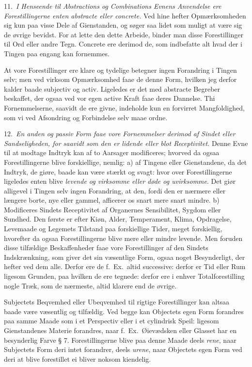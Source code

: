 \documentclass[12pt,a4paper]{article}
\newcommand{\opage}[1]{\marginnote{\footnotesize\textit{[#1]}}}
\begin{document}
11.~\emph{I Henseende til Abstractions og Combinations Evnens Anvendelse ere
Forestillingerne enten abstracte eller concrete.} Ved hine hefter Opmærksomheden sig
kun paa visse Dele af Gienstanden, og søger saa lidet som muligt at være sig de
øvrige bevidst. For at lette den dette Arbeide, binder man disse Forestillinger til
Ord eller andre Tegn. Concrete ere derimod de, som indbefatte alt hvad der i Tingen
paa engang kan fornemmes.

At vore Forestillinger ere klare og tydelige betegner ingen Forandring i Tingen selv;
men ved virksom Opmærksomhed faae de denne Form, hvilken jeg derfor kalder baade
subjectiv og activ. Ligeledes er det med abstracte Begreber beskaffet, der ogsaa ved
vor egen active Kraft faae deres Dannelse. Thi Fornemmelserne, saavidt de ere givne,
indeholde kun en forvirret Mangfoldighed, som vi ved Afsondring og Forbindelse selv
maae ordne.

12.~\emph{En anden og passiv Form faae vore Fornemmelser derimod af Sindet eller
Sandseligheden, for saavidt som den er lidende eller blot Receptivitet.} Denne Evne
til at modtage Indtryk kan af to Aarsager modificeres; hvorved da ogsaa
Forestillingerne blive forskiellige, nemlig: a) af Tingene eller Gienstandene, da det
Indtryk, de giøre, baade kan være stærkt og svagt: hvor%
\opage{52}over Forestillingerne ligeledes enten blive \emph{levende og virksomme eller døde og
uvirksomme}. Det giør alligevel i Tingen selv ingen Forandring, at den, fordi den er
nærmere eller længere borte, nye eller gammel, afficerer os snart mere snart mindre.
b) Modificeres Sindets Receptivitet af Organernes Sensibilitet, Sygdom eller Sundhed.
Den første er efter Kiøn, Alder, Temperament, Klima, Opdragelse, Levemaade og
Legemets Tilstand paa forskiellige Tider, meget forskiellig, hvorefter da ogsaa
Forestillingerne blive mere eller mindre levende. Men foruden disse tilfældige
Beskaffenheder faae vore Forestillinger af den Sindets Indskrænkning, som giver det
sin væsentlige Form, ogsaa noget Besynderligt, der hefter ved dem alle. Derfor ere de
f.~Ex.\ altid successive: derfor er Tid eller Rum ligesom Grunden, paa hvilken de ere
tegnede: derfor ere i enhver Totalforestilling nogle Træk, som de nærmeste, altid
klarere end de øvrige.

Subjectets Beqvemhed eller Ubeqvemhed til rigtige Forestillinger kan altsaa baade
være væsentlig og tilfældig. Ved begge kan Objectets egen Form forandres paa samme
Maade som i et Perspectiv eller i et cylindrisk Speil: ligesom Gienstandenes Materie
forandres, naar f.~Ex.\ Øievædsken eller Glasset har en besynderlig Farve § 7.
Forestillingerne blive paa denne Maade deels \emph{rene}, naar Subjectets Form deri
intet forandrer,
\opage{53} deels \emph{urene}, naar Objectets egen Form ved deri at blive forestillet ei bliver
noksom kiendelig.
\end{document}
